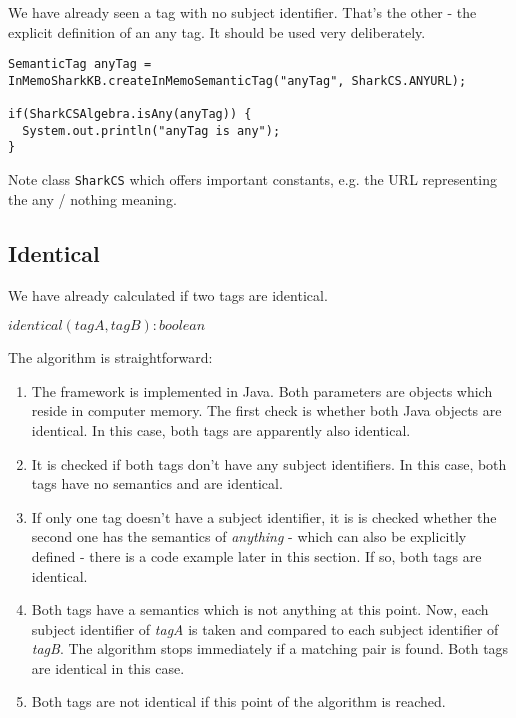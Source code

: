 We have already seen a tag with no subject identifier. That's the other - the explicit definition of an any tag. It should be used very deliberately.

\begin{verbatim}
SemanticTag anyTag = 
InMemoSharkKB.createInMemoSemanticTag("anyTag", SharkCS.ANYURL);

if(SharkCSAlgebra.isAny(anyTag)) {
  System.out.println("anyTag is any");
}
\end{verbatim}

Note class {\tt SharkCS} which offers important constants, e.g. the URL 
representing the any / nothing meaning.

\subsection{Identical}
We have already calculated if two tags are identical. 

$identical(tagA, tagB): boolean$

The algorithm is straightforward:

\begin{enumerate}
    \item 
The framework is implemented in Java. Both parameters are objects which reside in computer memory. The first check is whether both Java objects are identical. In this case, both tags are apparently also identical.

\item
It is checked if both tags don't have any subject identifiers. In this case, both tags have no semantics and are identical.

\item
If only one tag doesn't have a subject identifier, it is is checked whether the second one has the semantics of {\it anything} - which can also be explicitly defined - there is a code example later in this section. If so, both tags are identical.

\item
Both tags have a semantics which is not anything at this point. Now, each subject identifier of {\it tagA} is taken and compared to each subject identifier of {\it tagB}. The algorithm stops immediately if a matching pair is found. Both tags are identical in this case.

\item
Both tags are not identical if this point of the algorithm is reached.

\end{enumerate}


